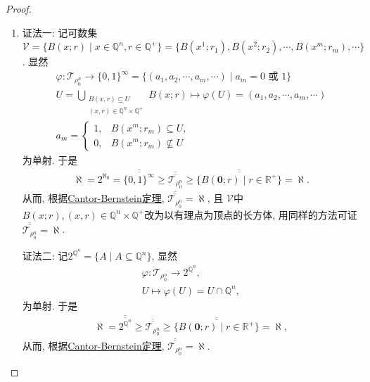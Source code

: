 \documentclass[../../main.tex]{subfiles}%
\begin{document}
\begin{proof}
\begin{enumerate}[(1)]
\item {\color{blue}证法一:}
记可数集$\mathscr{V}=\{B(x; r)\mid x\in \mathbb{Q}^n, r\in \mathbb{Q}^+\}=\{B(x^1; r_1),B(x^2; r_2),\cdots,B(x^m; r_m),\cdots\}$. 显然
\begin{gather*}
\varphi: \mathscr{T}_{\rho_0^n} \to \{0,1\}^\infty = \{(a_1,a_2,\cdots,a_m,\cdots)\mid a_m = 0\text{ 或 }1\} \\
U = \bigcup_{\substack{B(x,r)\subseteq U \\ (x,r)\in \mathbb{Q}^n\times \mathbb{Q}^+}} B(x; r) \mapsto \varphi(U) = (a_1,a_2,\cdots,a_m,\cdots) \\
a_m = \begin{cases}
1, & B(x^m; r_m) \subseteq U, \\
0, & B(x^m; r_m) \nsubseteq U
\end{cases}
\end{gather*}
为单射. 于是
\begin{align*}
\aleph = 2^{\aleph_0} = \overline{\overline{\{0,1\}^\infty}} \geqslant \overline{\overline{\mathscr{T}_{\rho_0^n}}} \geqslant \overline{\overline{\{B(\mathbf{0}; r)\mid r \in \mathbb{R}^+\}}} = \aleph.
\end{align*}
从而, 根据\hyperref[Set-Theory-theorem:Cantor-Bernstein定理]{Cantor-Bernstein定理}, $\overline{\overline{\mathscr{T}_{\rho_0^n}}} = \aleph$, 且
$\mathscr{V}$中$B(x; r),(x,r)\in \mathbb{Q}^n \times \mathbb{Q}^+$改为以有理点为顶点的长方体, 用同样的方法可证$\overline{\overline{\mathscr{T}_{\rho_0^n}}} = \aleph$.

{\color{blue}证法二:}
记$2^{\mathbb{Q}^n} = \{A\mid A\subseteq \mathbb{Q}^n\}$, 显然
\begin{gather*}
\varphi: \mathscr{T}_{\rho_0^n} \to 2^{\mathbb{Q}^n}, \\
U \mapsto \varphi(U) = U \cap \mathbb{Q}^n,
\end{gather*}
为单射. 于是
\begin{align*}
\aleph = \overline{\overline{2^{\mathbb{Q}^n}}} \geqslant \overline{\overline{\mathscr{T}_{\rho_0^n}}} \geqslant \overline{\overline{\{B(\mathbf{0}; r)\mid r \in \mathbb{R}^+\}}} = \aleph,
\end{align*}
从而, 根据\hyperref[Set-Theory-theorem:Cantor-Bernstein定理]{Cantor-Bernstein定理}, $\overline{\overline{\mathscr{T}_{\rho_0^n}}} = \aleph$.


\end{enumerate}
\end{proof}
\end{document}
